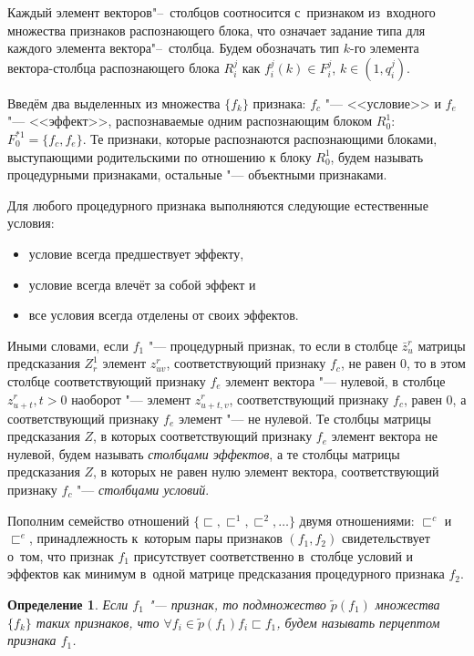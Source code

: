 \documentclass[a4paper, 12pt]{article}
\theoremstyle{plain}
\newtheorem{Def}{Определение}
\begin{document}
		Каждый элемент векторов"--~столбцов соотносится с~признаком из~входного множества признаков распознающего блока, что означает задание типа для каждого элемента вектора"--~столбца. Будем обозначать тип $k$-го элемента вектора-столбца распознающего блока $R_i^j$ как $f_i^j(k)\in F_i^j$, $k\in(1,q_i^j)$. 
		
		Введём два выделенных из множества $\{f_k\}$ признака: $f_c$ "--- <<условие>> и $f_e$ "--- <<эффект>>, распознаваемые одним распознающим блоком $R_0^1$: $F_0^{*1}=\{f_c,f_e\}$. Те признаки, которые распознаются распознающими блоками, выступающими родительскими по отношению к блоку $R_0^1$, будем называть процедурными признаками, остальные "--- объектными признаками.
		
		Для любого процедурного признака выполняются следующие естественные условия:
		\begin{itemize}
			\item условие всегда предшествует эффекту,
			\item условие всегда влечёт за собой эффект и
			\item все условия всегда отделены от своих эффектов.
		\end{itemize}
		
		Иными словами, если $f_1$ "--- процедурный признак, то если в столбце $\bar z_u^r$ матрицы предсказания $Z_r^1$ элемент $z_{uv}^r$, соответствующий признаку $f_c$, не равен $0$, то в этом столбце соответствующий признаку $f_e$ элемент вектора "--- нулевой, в столбце $z_{u+t}^r, t>0$ наоборот "--- элемент $z_{u+t,v}^r$, соответствующий признаку $f_c$, равен $0$, а соответствующий признаку $f_e$ элемент "--- не нулевой. Те столбцы матрицы предсказания $Z$, в которых соответствующий признаку $f_e$ элемент вектора не нулевой, будем называть \textit{столбцами эффектов}, а те столбцы матрицы предсказания $Z$, в которых не равен нулю элемент вектора, соответствующий признаку $f_c$ "--- \textit{столбцами условий}. 
		
		Пополним семейство отношений $\{\sqsubset,\sqsubset^1,\sqsubset^2,\dots\}$ двумя отношениями: $\sqsubset^c$ и $\sqsubset^e$, принадлежность к~которым пары признаков $(f_1,f_2)$ свидетельствует о~том, что признак $f_1$ присутствует соответственно в~столбце условий и эффектов как минимум в~одной матрице предсказания процедурного признака $f_2$.
		
		\begin{Def}
			Если $f_1$ "--- признак, то подмножество $\tilde p(f_1)$ множества $\{f_k\}$ таких признаков, что $\forall f_i\in\tilde p(f_1) f_i\sqsubset f_1$, будем называть перцептом признака $f_1$.
		\end{Def}
		
\end{document}
